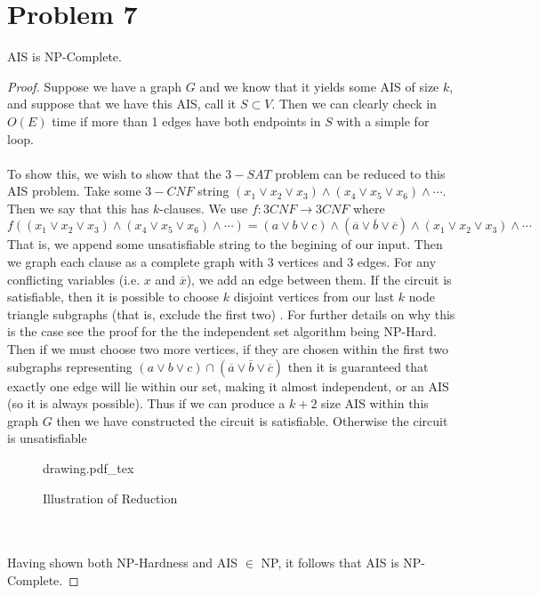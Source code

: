 \documentclass{article}
\newcommand{\incfig}[1]{%
    \def\svgwidth{.5\columnwidth}
    {#1.pdf_tex}
}
\theoremstyle{definition}
\begin{document}
\section*{Problem 7}
\begin{mdframed}
    AIS is NP-Complete.
\end{mdframed}
\begin{proof}
    Suppose we have a graph $G$ and we know that it yields some AIS of size $k$, and suppose that we have this 
    AIS, call it $S \subset V$. Then we can clearly check in $O(E)$ time if more than 1 edges have both endpoints in $S$ with a simple for loop.\\\\
    To show this, we wish to show that the $3-SAT$ problem can be reduced to this AIS problem. Take some $3-CNF$ string
    $(x_1 \vee x_2 \vee x_3) \wedge (x_4 \vee x_5 \vee x_6) \wedge \cdots$. Then we say that this has $k$-clauses.
    We use $f:3CNF \rightarrow 3CNF$ where 
    \[
        f((x_1 \vee x_2 \vee x_3) \wedge (x_4 \vee x_5 \vee x_6) \wedge \cdots) = (a\vee b\vee c) \wedge (\overline{a} \vee \overline{b} \vee \overline{c}) \wedge (x_1 \vee x_2 \vee x_3) \wedge \cdots
        \]
        That is, we append some unsatisfiable string to the begining of our input. Then we graph each clause as a complete graph with 3 vertices and 3 edges.
        For any conflicting variables (i.e. $x$ and $\overline{x}$), we add an edge between them. If the circuit is satisfiable, then it is possible to choose 
        $k$ disjoint vertices from our last $k$ node triangle subgraphs (that is, exclude the first two) . For further details on why this is the case 
        see the proof for the the independent set algorithm being NP-Hard. Then if we must choose two more vertices,
        if they are chosen within the first two subgraphs representing $(a \vee b \vee c) \cap (\overline{a} \vee \overline{b} \vee \overline{c})$ then it is guaranteed 
        that exactly one edge will lie within our set, making it almost independent, or an AIS (so it is always possible). Thus if we can produce a $k + 2$ size AIS within this graph $G$ then we 
        have constructed the circuit is satisfiable. Otherwise the circuit is unsatisfiable
        \begin{figure}[ht]
            \centering
            \incfig{drawing}
            \caption{Illustration of Reduction}
            \label{fig:drawing}
        \end{figure}
        \\\\
        Having shown both NP-Hardness and AIS $\in$ NP, it follows that AIS is NP-Complete.
\end{proof}
\end{document}
